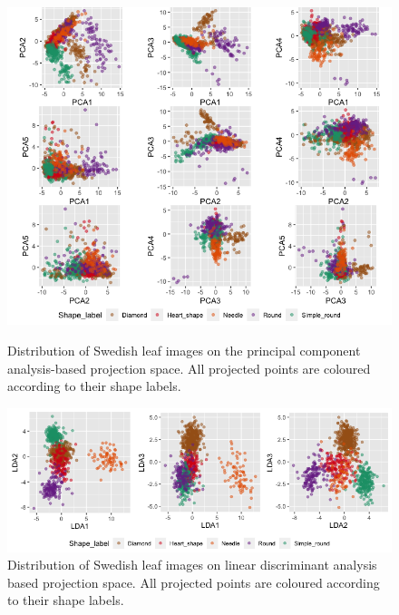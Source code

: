 \documentclass{article}
\begin{document}
\begin{figure}
\centering
\includegraphics[width=1\columnwidth]{img/swedishshapepca.png}
\caption{\label{pcaswedish}Distribution of Swedish leaf images on the
principal component analysis-based projection space. All
projected points are coloured according to their shape labels.}
\includegraphics[width=1\columnwidth]{img/swedishshapelda.png}
\caption{\label{ldaswedish}Distribution of Swedish leaf images on linear discriminant analysis based projection space. All
projected points are coloured according to their shape labels.}
\end{figure}
\end{document}
